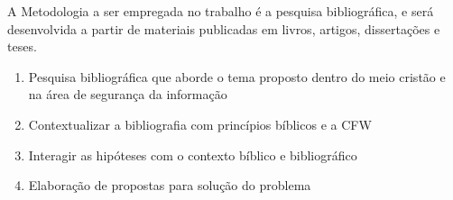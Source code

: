 \documentclass[12pt,a4paper]{article}
\begin{document}
A Metodologia a ser empregada no trabalho é a pesquisa bibliográfica, e será desenvolvida a partir de materiais publicadas em livros, artigos, dissertações e teses.
\begin{enumerate}
    \item Pesquisa bibliográfica que aborde o tema proposto dentro do meio cristão e na área de segurança da informação
    \item Contextualizar a bibliografia com princípios bíblicos e a CFW
    \item Interagir as hipóteses com o contexto bíblico e bibliográfico
    \item Elaboração de propostas para solução do problema
\end{enumerate}




\end{document}
